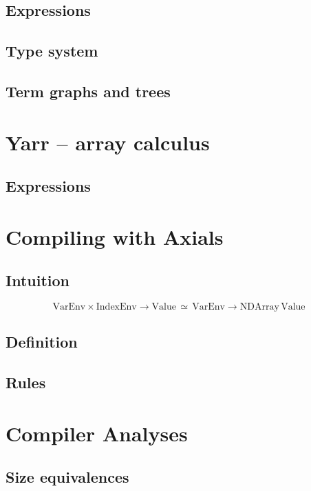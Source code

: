 \subsection{Expressions}

\subsection{Type system}

\subsection{Term graphs and trees}

\section{Yarr -- array calculus}

\subsection{Expressions}

\section{Compiling with Axials}

\subsection{Intuition}

$$ \mathrm{VarEnv} \times \mathrm{IndexEnv} \to \mathrm{Value} \,\simeq\, \mathrm{VarEnv} \to \mathrm{NDArray}\, \mathrm{Value} $$

\subsection{Definition}

\subsection{Rules}

\section{Compiler Analyses}

\subsection{Size equivalences}

